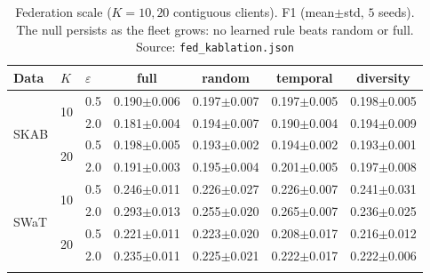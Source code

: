 \documentclass[pdflatex,sn-mathphys-num]{sn-jnl}
\theoremstyle{thmstyleone}
\theoremstyle{thmstyletwo}
\theoremstyle{thmstylethree}
\begin{document}
\begin{table}[t]
\centering
\caption{Federation scale ($K{=}10, 20$ contiguous clients). F1 (mean$\pm$std, $5$
seeds). The null persists as the fleet grows: no learned rule beats random or full.
Source: \texttt{fed\_kablation.json}}\label{tab:kabl}
\setlength{\tabcolsep}{3.5pt}
\begin{tabular}{@{}lllcccc@{}}
\toprule
Data & $K$ & $\varepsilon$ & full & random & temporal & diversity \\
\midrule
\multirow{4}{*}{SKAB} & \multirow{2}{*}{10} & 0.5 & 0.190$\pm$0.006 & 0.197$\pm$0.007 & 0.197$\pm$0.005 & 0.198$\pm$0.005 \\
 & & 2.0 & 0.181$\pm$0.004 & 0.194$\pm$0.007 & 0.190$\pm$0.004 & 0.194$\pm$0.009 \\
 & \multirow{2}{*}{20} & 0.5 & 0.198$\pm$0.005 & 0.193$\pm$0.002 & 0.194$\pm$0.002 & 0.193$\pm$0.001 \\
 & & 2.0 & 0.191$\pm$0.003 & 0.195$\pm$0.004 & 0.201$\pm$0.005 & 0.197$\pm$0.008 \\
\midrule
\multirow{4}{*}{SWaT} & \multirow{2}{*}{10} & 0.5 & 0.246$\pm$0.011 & 0.226$\pm$0.027 & 0.226$\pm$0.007 & 0.241$\pm$0.031 \\
 & & 2.0 & 0.293$\pm$0.013 & 0.255$\pm$0.020 & 0.265$\pm$0.007 & 0.236$\pm$0.025 \\
 & \multirow{2}{*}{20} & 0.5 & 0.221$\pm$0.011 & 0.223$\pm$0.020 & 0.208$\pm$0.017 & 0.216$\pm$0.012 \\
 & & 2.0 & 0.235$\pm$0.011 & 0.225$\pm$0.021 & 0.222$\pm$0.017 & 0.222$\pm$0.006 \\
\botrule
\end{tabular}
\end{table}
\end{document}
